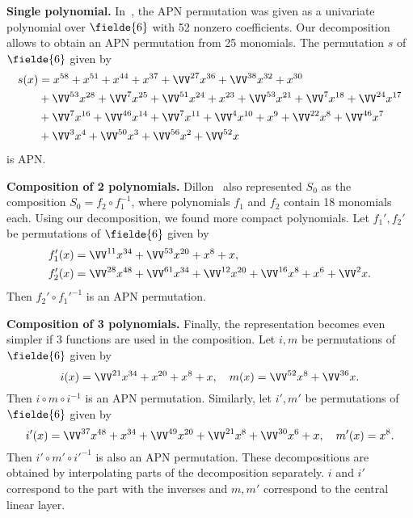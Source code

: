 \textbf{Single polynomial.}
In~\cite{DillonAPN}, the APN permutation was given as a univariate polynomial over $\fielde{6}$ with 52 nonzero coefficients. Our decomposition allows to obtain an APN permutation from 25 monomials. The permutation $s$ of $\fielde{6}$ given by
\begin{align*}
    s(x) &= x^{58} + x^{51} + x^{44} + x^{37} + \VV^{27}x^{36} + \VV^{38}x^{32} + x^{30} \\
         &+ \VV^{53}x^{28} + \VV^{7}x^{25} + \VV^{51}x^{24} + x^{23} + \VV^{53}x^{21} + \VV^{7}x^{18} + \VV^{24}x^{17}\\
         &+ \VV^{7}x^{16} + \VV^{46}x^{14} + \VV^{7}x^{11} + \VV^{4}x^{10} + x^{9} + \VV^{22}x^{8} + \VV^{46}x^{7}\\
         &+ \VV^{3}x^{4} + \VV^{50}x^{3} + \VV^{56}x^{2} + \VV^{52}x
\end{align*}
is APN.

\textbf{Composition of 2 polynomials.}
Dillon~\etal{} also represented $S_0$ as the composition $S_0 = f_2 \circ f_1^{-1}$, where polynomials $f_1$ and $f_2$ contain 18 monomials each. Using our decomposition, we found more compact polynomials. Let $f_1', f_2'$ be permutations of $\fielde{6}$ given by
\begin{align*}
f_1'(x) &= \VV^{11}x^{34} + \VV^{53}x^{20} + x^{8} + x,\\
f_2'(x) &= \VV^{28}x^{48} + \VV^{61}x^{34} + \VV^{12}x^{20} + \VV^{16}x^{8} + x^{6} + \VV^{2}x.
\end{align*}
Then $f_2' \circ f_1'^{-1}$ is an APN permutation.

\textbf{Composition of 3 polynomials.}
Finally, the representation becomes even simpler if 3 functions are used in the composition. Let $i,m$ be permutations of $\fielde{6}$ given by
$$
i(x) = \VV^{21}x^{34} + x^{20} + x^8 + x, \quad
m(x) = \VV^{52}x^8 + \VV^{36}x.
$$
Then $i \circ m \circ i^{-1}$ is an APN permutation. Similarly, let $i',m'$ be permutations of $\fielde{6}$ given by
$$
i'(x) = \VV^{37}x^{48} + x^{34} + \VV^{49}x^{20} + \VV^{21}x^{8} + \VV^{30}x^{6} + x, \quad
m'(x) = x^8.
$$
Then $i' \circ m' \circ i'^{-1}$ is also an APN permutation.
These decompositions are obtained by interpolating parts of the decomposition separately. $i$ and $i'$ correspond to the part with the inverses and $m,m'$ correspond to the central linear layer.

